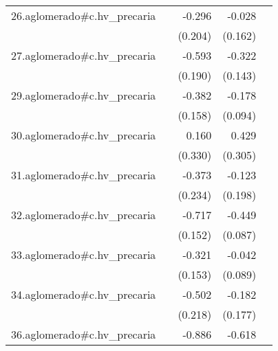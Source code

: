 {\begin{longtable}{l*{4}{D{.}{.}{-1}}}
\addlinespace
26.aglomerado#c.hv\_precaria&                     &      -0.296         &      -0.028         &                     \\
            &                     &     (0.204)         &     (0.162)         &                     \\
\addlinespace
27.aglomerado#c.hv\_precaria&                     &      -0.593\sym{**} &      -0.322\sym{*}  &                     \\
            &                     &     (0.190)         &     (0.143)         &                     \\
\addlinespace
29.aglomerado#c.hv\_precaria&                     &      -0.382\sym{*}  &      -0.178         &                     \\
            &                     &     (0.158)         &     (0.094)         &                     \\
\addlinespace
30.aglomerado#c.hv\_precaria&                     &       0.160         &       0.429         &                     \\
            &                     &     (0.330)         &     (0.305)         &                     \\
\addlinespace
31.aglomerado#c.hv\_precaria&                     &      -0.373         &      -0.123         &                     \\
            &                     &     (0.234)         &     (0.198)         &                     \\
\addlinespace
32.aglomerado#c.hv\_precaria&                     &      -0.717\sym{***}&      -0.449\sym{***}&                     \\
            &                     &     (0.152)         &     (0.087)         &                     \\
\addlinespace
33.aglomerado#c.hv\_precaria&                     &      -0.321\sym{*}  &      -0.042         &                     \\
            &                     &     (0.153)         &     (0.089)         &                     \\
\addlinespace
34.aglomerado#c.hv\_precaria&                     &      -0.502\sym{*}  &      -0.182         &                     \\
            &                     &     (0.218)         &     (0.177)         &                     \\
\addlinespace
36.aglomerado#c.hv\_precaria&                     &      -0.886\sym{***}&      -0.618\sym{***}&                     \\

\end{longtable}}
